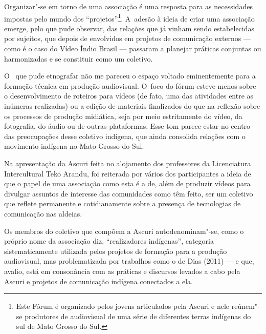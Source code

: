 Organizar"-se em torno de uma associação é uma resposta para as
necessidades impostas pelo mundo dos ``projetos''\footnote[11]{Este Fórum é
organizado pelos jovens articulados pela Ascuri e nele reúnem"-se
produtores de audiovisual de uma série de diferentes terras indígenas
do sul de Mato Grosso do Sul. }. A~adesão à ideia de criar uma
associação emerge, pelo que pude observar, das relações que já vinham
sendo estabelecidas por sujeitos, que depois de envolvidos em projetos
de comunicação externos --- como é o caso do Vídeo Índio Brasil ---
passaram a planejar práticas conjuntas ou harmonizadas e se constituir
como um coletivo.

O~ que pude etnografar não me pareceu o espaço voltado eminentemente
para a formação técnica em produção audiovisual. O~foco do fórum esteve
menos sobre o desenvolvimento de roteiros para vídeos (de fato, uma das
atividades entre as inúmeras realizadas) ou a edição de materiais
finalizados do que na reflexão sobre os processos de produção
midiática, seja por meio estritamente do vídeo, da fotografia, do áudio
ou de outras plataformas. Esse tom parece estar no centro das
preocupações desse coletivo indígena, que ainda consolida relações com
o movimento indígena no Mato Grosso do Sul.

Na apresentação da Ascuri feita no alojamento dos professores da
Licenciatura Intercultural Teko Arandu, foi reiterada por vários dos
participantes a ideia de que o papel de uma associação como esta é a
de, além de produzir vídeos para divulgar assuntos de interesse das
comunidades como têm feito, ser um coletivo que reflete permanente e cotidianamente
sobre a presença de tecnologias de comunicação nas aldeias.

Os membros do coletivo que compõem a Ascuri autodenominam"-se, como o
próprio nome da associação diz, ``realizadores indígenas'', categoria
sistematicamente utilizada pelos projetos de formação para a produção
audiovisual, mas problematizada por trabalhos como o de Dias (2011) --- e
que, avalio, está em consonância com as práticas e discursos levados a
cabo pela Ascuri e projetos de comunicação indígena conectados a ela.

